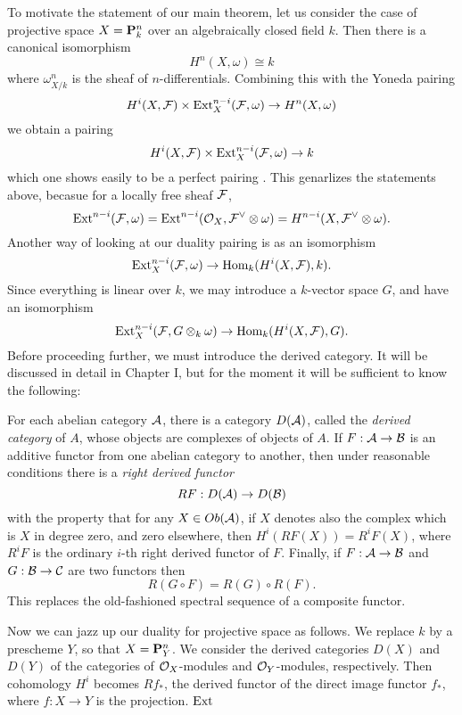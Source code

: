 To motivate the statement of our main theorem, let us consider the case of projective space $X=\mathbf{P}^n_k$ over an algebraically closed field $k$. Then there is a canonical isomorphism
\[H^n(X,\omega)\cong k\]
where $\omega^n_{X/k}$ is the sheaf of $n$-differentials. Combining this with the Yoneda pairing
\[H^i(X,\mathcal{F})\times \mathrm{Ext}_X^{n-i}(\mathcal{F},\omega)\rightarrow H^n(X,\omega)\]
we obtain a pairing
\[H^i(X,\mathcal{F})\times \mathrm{Ext}^{n-i}_X(\mathcal{F},\omega)\rightarrow k\]
which one shows easily to be a perfect pairing \cite{}. This genarlizes the statements above, becasue for a locally free sheaf $\mathcal{F}$,
\[\mathrm{Ext}^{n-i}(\mathcal{F},\omega)=\mathrm{Ext}^{n-i}(\mathcal{O}_X,\mathcal{F}^{\vee}\otimes \omega)=H^{n-i}(X,\mathcal{F}^{\vee}\otimes \omega).\]
Another way of looking at our duality pairing is as an isomorphism
\[\mathrm{Ext}^{n-i}_X (\mathcal{F},\omega)\rightarrow \mathrm{Hom}_k(H^i(X,\mathcal{F}),k).\]
Since everything is linear over $k$, we may introduce a $k$-vector space $G$, and have an isomorphism
\[\mathrm{Ext}^{n-i}_X (\mathcal{F},G\otimes_k\omega)\rightarrow \mathrm{Hom}_k(H^i(X,\mathcal{F}),G).\]
Before proceeding further, we must introduce the derived category. It will be discussed in detail in Chapter I, but for the moment it will be sufficient to know the following:

For each abelian category $\mathcal{A}$, there is a category $D(\mathcal{A})$, called the {\it derived category} of $A$, whose objects are complexes of objects of $A$. If $F:\mathcal{A}\rightarrow \mathcal{B}$ is an additive functor from one abelian category to another, then under reasonable conditions there is a {\it right derived functor} \[RF:D(\mathcal{A})\rightarrow D(\mathcal{B})\] 
with the property that for any $X\in Ob(\mathcal{A})$, if $X$ denotes also the complex which is $X$ in degree zero, and zero elsewhere, then $H^i(RF(X))=R^iF(X)$, where $R^iF$ is the ordinary $i$-th right derived functor of $F$. Finally, if $F:\mathcal{A}\to \mathcal{B}$ and $G:\mathcal{B}\to \mathcal{C}$ are two functors then 
\[R(G\circ F)=R(G)\circ R(F).\]
This replaces the old-fashioned spectral sequence of a composite functor.

Now we can jazz up our duality for projective space as follows. We replace $k$ by a prescheme $Y$, so that $X=\mathbf{P}^n_Y$. We consider the derived categories $D(X)$ and $D(Y)$ of the categories of $\mathcal{O}_X$-modules and $\mathcal{O}_Y$-modules, respectively. Then cohomology $H^i$ becomes $Rf_*$, the derived functor of the direct image functor $f_*$, where $f:X\to Y$ is the projection. $\mathrm{Ext}$

